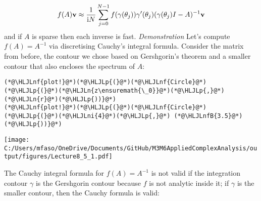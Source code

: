 \documentclass[12pt,landscape]{article}
\newcommand{\HLJLn}[1]{#1}
\newcommand{\HLJLnf}[1]{\textcolor[RGB]{66,102,213}{#1}}
\newcommand{\HLJLnfB}[1]{\textcolor[RGB]{59,151,46}{#1}}
\newcommand{\HLJLni}[1]{\textcolor[RGB]{59,151,46}{#1}}
\newcommand{\HLJLp}[1]{#1}
\def\I{ {\rm i} }
\def\vc#1{ {\mathbf #1} }
\def\cent#1{\begin{center}#1\end{center} }
\begin{document}
{\[
f(A) \vc v \approx {1 \over \I N}  \sum_{j=0}^{N-1} f(\gamma(\theta_j)) \gamma'(\theta_j) (\gamma(\theta_j) I - A)^{-1} \vc v
\]
and if $A$ is sparse then each inverse is fast.
\newpage
\emph{Demonstration} Let's compute $f(A) = A^{-1}$ via discretising Cauchy's integral formula. Consider the matrix from before, the contour we chose based on Gershgorin's theorem and a smaller contour that also encloses the spectrum of $A$:


\begin{lstlisting}
(*@\HLJLnf{plot!}@*)(*@\HLJLp{(}@*)(*@\HLJLnf{Circle}@*)(*@\HLJLp{(}@*)(*@\HLJLn{z\ensuremath{\_0}}@*)(*@\HLJLp{,}@*) (*@\HLJLn{r}@*)(*@\HLJLp{))}@*)
(*@\HLJLnf{plot!}@*)(*@\HLJLp{(}@*)(*@\HLJLnf{Circle}@*)(*@\HLJLp{(}@*)(*@\HLJLni{4}@*)(*@\HLJLp{,}@*) (*@\HLJLnfB{3.5}@*)(*@\HLJLp{))}@*)
\end{lstlisting}

\cent{\texttt{[image: C:/Users/mfaso/OneDrive/Documents/GitHub/M3M6AppliedComplexAnalysis/output/figures/Lecture8\_5\_1.pdf]}}

The Cauchy integral formula for $f(A) = A^{-1}$ is not valid if the integration contour $\gamma$ is the Gershgorin contour because $f$ is not analytic inside it; if $\gamma$ is the smaller contour, then the Cauchy formula is valid:


}
\end{document}
